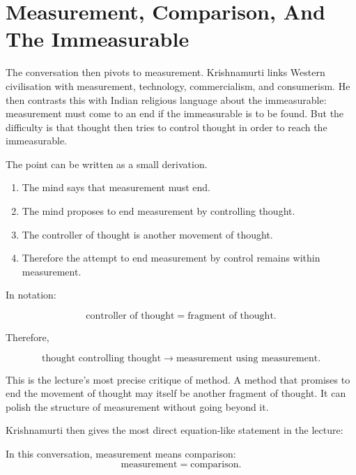 \section{Measurement, Comparison, And The Immeasurable}

The conversation then pivots to measurement. Krishnamurti links Western civilisation with measurement, technology, commercialism, and consumerism. He then contrasts this with Indian religious language about the immeasurable: measurement must come to an end if the immeasurable is to be found. But the difficulty is that thought then tries to control thought in order to reach the immeasurable.

The point can be written as a small derivation.

\begin{enumerate}
\item The mind says that measurement must end.
\item The mind proposes to end measurement by controlling thought.
\item The controller of thought is another movement of thought.
\item Therefore the attempt to end measurement by control remains within measurement.
\end{enumerate}

In notation:

\begin{equation}
\text{controller of thought}
=
\text{fragment of thought}.
\end{equation}

Therefore,

\begin{equation}
\text{thought controlling thought}
\longrightarrow
\text{measurement using measurement}.
\end{equation}

This is the lecture's most precise critique of method. A method that promises to end the movement of thought may itself be another fragment of thought. It can polish the structure of measurement without going beyond it.

Krishnamurti then gives the most direct equation-like statement in the lecture:

\begin{definition}
In this conversation, measurement means comparison:
\begin{equation}
\text{measurement}=\text{comparison}.
\end{equation}
\end{definition}

